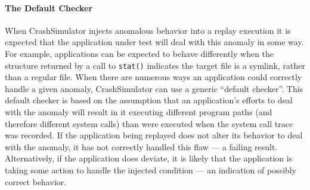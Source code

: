 

    
    \paragraph{The Default Checker}

    When CrashSimulator injects anomalous behavior into a replay execution it is
    expected that the application under test will deal with this
    anomaly in some way. For example, applications
    can be expected to behave differently when
    the structure returned by a call to {\tt stat()} indicates the target file
    is a symlink, rather than a regular file.
    When there are numerous ways an
    application could correctly handle a given anomaly, CrashSimulator 
    can use a generic ``default checker''.  This default checker
    is based on the assumption that an application's efforts to deal with the anomaly
    will result in it executing different program paths (and therefore different
    system calls) than were executed when the system call trace
    was recorded.  If the application being replayed does not
    alter its behavior to deal with the anomaly, it has not
    correctly handled this flaw --- a failing result.  Alternatively, if the
    application does deviate,
    it is likely that the application is taking some action
    to handle the injected condition --- an indication of possibly correct
    behavior.

